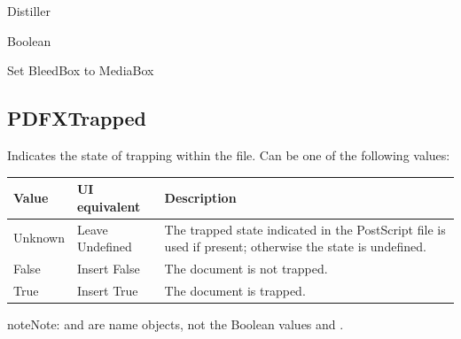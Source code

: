\documentclass[letterpaper,12pt,english,openany,oneside]{sphinxmanual}
\begin{document}
\label{\detokenize{PDF_Create_CommonSettings:supported-by-118}}

Distiller

\label{\detokenize{PDF_Create_CommonSettings:type-117}}

Boolean

\label{\detokenize{PDF_Create_CommonSettings:ui-name-99}}

Set BleedBox to MediaBox

\label{\detokenize{PDF_Create_CommonSettings:default-value-112}}

\begin{sphinxVerbatim}[commandchars=\\\{\}]
\end{sphinxVerbatim}


\subsection{PDFXTrapped}
\label{\detokenize{PDF_Create_CommonSettings:pdfxtrapped}}
Indicates the state of trapping within the file. Can be one of the following values:


\begin{savenotes}\sphinxattablestart
\centering
{}\label{\detokenize{PDF_Create_CommonSettings:section-23}}\nobreak
\begin{tabulary}{\linewidth}[t]{|T|T|T|}
\hline
\sphinxstyletheadfamily 
Value
&\sphinxstyletheadfamily 
UI equivalent
&\sphinxstyletheadfamily 
Description
\\
\hline
Unknown
&
Leave Undefined
&
The trapped state indicated in the PostScript file is used if present; otherwise the state is undefined.
\\
\hline
False
&
Insert False
&
The document is not trapped.
\\
\hline
True
&
Insert True
&
The document is trapped.
\\
\hline
\end{tabulary}
\par
\sphinxattableend\end{savenotes}

\begin{sphinxadmonition}{note}{Note:}
 and  are name objects, not the Boolean values  and  .
\end{sphinxadmonition}
\end{document}
